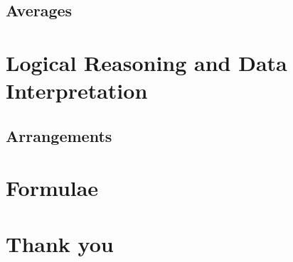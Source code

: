 \documentclass{book}
\begin{document}
\chapter{Averages}




\part{Logical Reasoning and Data Interpretation}

\chapter{Arrangements}





\part{Formulae}


\part{Thank you}
\end{document}
